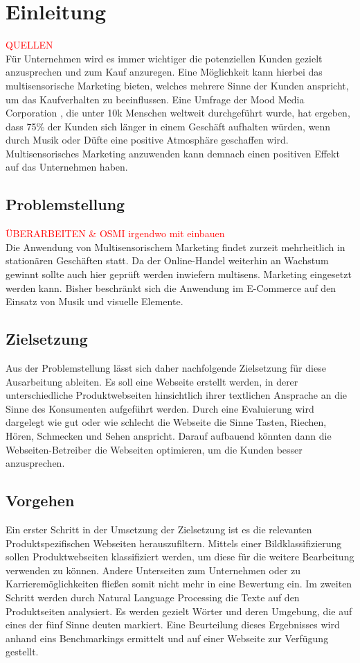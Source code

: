 \section{Einleitung}  \textcolor{red}{QUELLEN} \\
Für Unternehmen wird es immer wichtiger die potenziellen Kunden gezielt anzusprechen und zum Kauf anzuregen. Eine Möglichkeit kann hierbei das multisensorische Marketing bieten, welches mehrere Sinne der Kunden anspricht, um das Kaufverhalten zu beeinflussen. Eine Umfrage der Mood Media Corporation , die unter 10k Menschen weltweit durchgeführt wurde, hat ergeben, dass 75\% der Kunden sich länger in einem Geschäft aufhalten würden, wenn durch Musik oder Düfte eine positive Atmosphäre geschaffen wird.
Multisensorisches Marketing anzuwenden kann demnach einen positiven Effekt auf das Unternehmen haben.

\subsection{Problemstellung}
\textcolor{red}{ÜBERARBEITEN \& OSMI irgendwo mit einbauen} \\
Die Anwendung von Multisensorischem Marketing findet zurzeit mehrheitlich in stationären Geschäften statt. Da der Online-Handel weiterhin an Wachstum gewinnt sollte auch hier geprüft werden inwiefern multisens. Marketing eingesetzt werden kann.
Bisher beschränkt sich die Anwendung im E-Commerce auf den Einsatz von Musik und visuelle Elemente.

\subsection{Zielsetzung}
Aus der Problemstellung lässt sich daher nachfolgende Zielsetzung für diese Ausarbeitung ableiten. Es soll eine Webseite erstellt werden, in derer unterschiedliche Produktwebseiten hinsichtlich ihrer textlichen Ansprache an die Sinne des Konsumenten aufgeführt werden. Durch eine Evaluierung wird dargelegt wie gut oder wie schlecht die Webseite die Sinne Tasten, Riechen, Hören, Schmecken und Sehen anspricht.
Darauf aufbauend könnten dann die Webseiten-Betreiber die Webseiten optimieren, um die Kunden besser anzusprechen.

\subsection{Vorgehen}
Ein erster Schritt in der Umsetzung der Zielsetzung ist es die relevanten Produktspezifischen Webseiten herauszufiltern. Mittels einer Bildklassifizierung sollen Produktwebseiten klassifiziert werden, um diese für die weitere Bearbeitung verwenden zu können. Andere Unterseiten zum Unternehmen oder zu Karrieremöglichkeiten fließen somit nicht mehr in eine Bewertung ein. Im zweiten Schritt werden durch Natural Language Processing die Texte auf den Produktseiten analysiert. Es werden gezielt Wörter und deren Umgebung, die auf eines der fünf Sinne deuten markiert.
Eine Beurteilung dieses Ergebnisses wird anhand eins Benchmarkings ermittelt und auf einer Webseite zur Verfügung gestellt.

